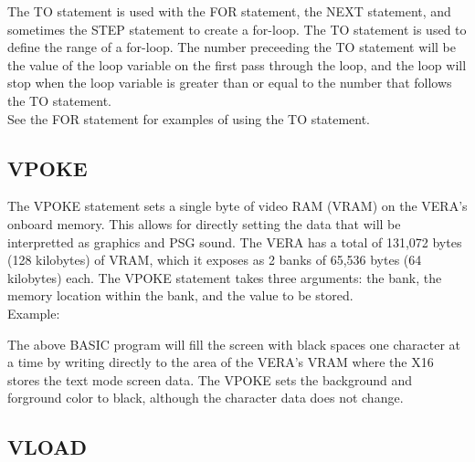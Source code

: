 The {\ttfamily TO} statement is used with the {\ttfamily FOR} statement, the
{\ttfamily NEXT} statement, and sometimes the {\ttfamily STEP} statement to
create a for-loop.  The {\ttfamily TO} statement is used to define the range of
a for-loop.  The number preceeding the {\ttfamily TO} statement will be the
value of the loop variable on the first pass through the loop, and the loop
will stop when the loop variable is greater than or equal to the number that
follows the {\ttfamily TO} statement.\\

See the {\ttfamily FOR} statement for examples of using the {\ttfamily TO}
statement.\\

\subsection{VPOKE}

The {\ttfamily VPOKE} statement sets a single byte of video RAM (VRAM) on the
VERA's onboard memory.  This allows for directly setting the data that will be
interpretted as graphics and PSG sound.  The VERA has a total of 131,072 bytes
(128 kilobytes) of VRAM, which it exposes as 2 banks of 65,536 bytes (64
kilobytes) each.  The {\ttfamily VPOKE} statement takes three arguments: the
bank, the memory location within the bank, and the value to be stored.\\

Example:\\


The above BASIC program will fill the screen with black spaces one character at
a time by writing directly to the area of the VERA's VRAM where the X16 stores
the text mode screen data.  The {\ttfamily VPOKE} sets the background and
forground color to black, although the character data does not change.\\


\subsection{VLOAD}

